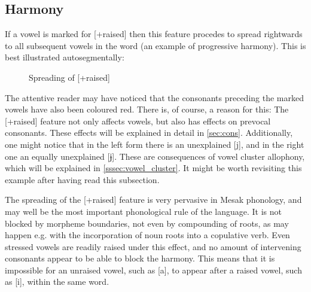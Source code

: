 \documentclass[paper=6in:9in, fontsize=10.5]{scrbook}
\newcommand{\y}{ɨ}
\newcommand{\ý}{ɨ́}
\newcommand{\jbar}{ɉ}
\newcommand{\dom}[1]{\hspace{0pt}{\color{red}#1}}
\begin{document}
\subsection{Harmony} \label{ssec:harmony}

If a vowel is marked for [+raised] then this feature procedes to spread rightwards to all subsequent vowels in the word (an example of progressive harmony). This is best illustrated autosegmentally:
\begin{figure}[H]
\centering

\caption{Spreading of [+raised]}
\end{figure}

The attentive reader may have noticed that the consonants preceding the marked vowels have also been coloured red. There is, of course, a reason for this: The [+raised] feature not only affects vowels, but also has effects on prevocal consonants. These effects will be explained in detail in \ref{sec:cons}. Additionally, one might notice that in the left form there is an unexplained [j], and in the right one an equally unexplained [\jbar]. These are consequences of vowel cluster allophony, which will be explained in \ref{sssec:vowel_cluster}. It might be worth revisiting this example after having read this subsection.

The spreading of the [+raised] feature is very pervasive in Mesak phonology, and may well be the most important phonological rule of the language. It is not blocked by morpheme boundaries, not even by compounding of roots, as may happen e.g. with the incorporation of noun roots into a copulative verb. Even stressed vowels are readily raised under this effect, and no amount of intervening consonants appear to be able to block the harmony. This means that it is impossible for an unraised vowel, such as [a], to appear after a raised vowel, such as [i], within the same word. 
\end{document}
